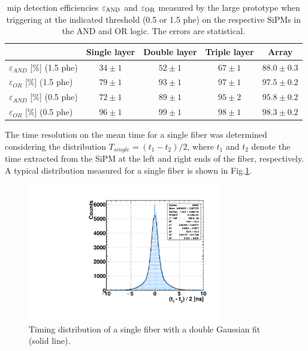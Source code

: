 \begin{refsection}
        \begin{table}
        	\begin{center}
        		\begin{tabular}{l | c | c | c | c } 
        		& Single layer & Double layer& Triple layer & Array  \\ \hline\hline
        			   $\varepsilon_{AND}$ [\%] (1.5 phe)  & $34\pm1$ & $52\pm1$ & $67\pm1$ & $88.0\pm0.3$ \\
        			  $\varepsilon_{OR}$ \hspace{0.13cm} [\%] (1.5 phe)    & $79\pm1$ & $93\pm1$ & $97\pm1$ & $97.5\pm0.2$ \\
        			   $\varepsilon_{AND}$ [\%] (0.5 phe) & $72\pm1$ & $89\pm1$ & $95\pm2$ & $95.8\pm0.2$ \\
        			   $\varepsilon_{OR}$ \hspace{0.13cm} [\%] (0.5 phe)   & $96\pm1$  & $99\pm1$ & $98\pm1$ & $98.3\pm0.2$ 
        		\end{tabular}
        	\end{center}	
        		\caption[Detection efficiencies for m.i.p.]{mip detection efficiencies $\varepsilon_{\rm AND}$ and $\varepsilon_{\rm OR}$ measured by the large prototype when triggering at the indicated threshold (0.5 or 1.5 phe) on the respective SiPMs in the AND and OR logic. The errors are statistical.}
        		\label{tab:DetectionEff}
        \end{table}
        
        
        The time resolution on the mean time for a single fiber was determined considering the distribution $T_{single} = (t_{1}-t_{2})/2$, where $t_{1}$ and $t_{2}$ denote the time extracted from the SiPM at the left and right ends of the fiber, respectively. A typical distribution measured for a single fiber is shown in Fig.\ref{fig:TimingSingleFibre}.
        \begin{figure}
        \centering
         \includegraphics[height = 6cm]{Figures/muEDM/prototype/prototype_timing.pdf}
         \caption{Timing distribution of a single fiber with a double Gaussian fit (solid line).}
        	\label{fig:TimingSingleFibre}
        \end{figure}
        

\end{refsection}
